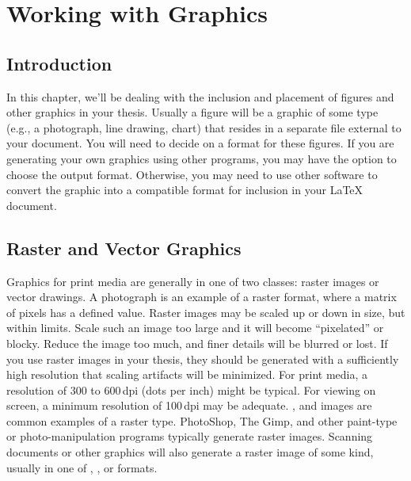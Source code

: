 
\chapter{Working with Graphics}

\section{Introduction}

In this chapter, we'll be dealing with the inclusion and placement of
figures and other graphics in your thesis.  Usually a figure will be a
graphic of some type (e.g., a photograph, line drawing, chart) that
resides in a separate file external to your document.  You will need
to decide on a format for these figures.  If you are generating your
own graphics using other programs, you may have the option to choose
the output format.  Otherwise, you may need to use other software to
convert the graphic into a compatible format for inclusion in your
\LaTeX{} document.

\section{Raster and Vector Graphics}
Graphics for print media are generally in one of two classes: raster
images or vector drawings.  A  photograph is an example of
a raster format, where a matrix of pixels has a defined value.  Raster
images may be scaled up or down in size, but within limits. Scale such
an image too large and it will become ``pixelated'' or blocky.
Reduce the image too much, and finer details will be blurred or lost.
If you use raster images in your thesis, they should be generated with
a sufficiently high resolution that scaling artifacts will be
minimized.  For print media, a resolution of 300 to 600\,dpi (dots per
inch) might be typical.  For viewing on screen, a minimum resolution
of 100\,dpi may be adequate.  ,  and 
images are common examples of a raster type.  PhotoShop, The Gimp, and
other paint-type or photo-manipulation programs typically generate
raster images.  Scanning documents or other graphics will also
generate a raster image of some kind, usually in one of ,
, or  formats.

